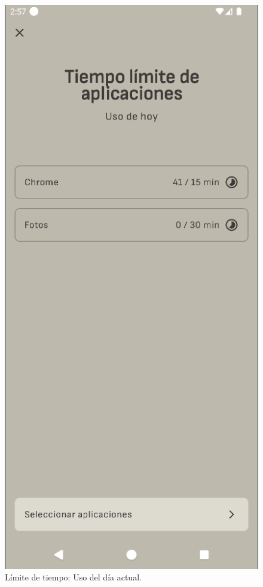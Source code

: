 \begin{figure}[ht!]
  \centering
  \captionsetup{justification=centering}
  \begin{minipage}{0.43\textwidth}
    \caption{Límite de tiempo: Uso del día actual.}
    \label{fig:limite_tiempo_aplicaciones}
    \centering
    \includegraphics[width=\textwidth]{Figuras/secciones/limite_tiempo_aplicaciones.png}

\end{minipage}
\end{figure}
